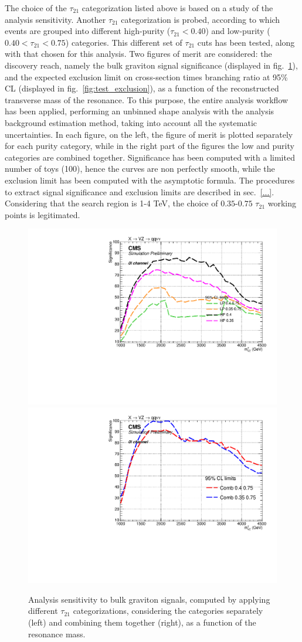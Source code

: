 \noindent The choice of the $\tau_{21}$ categorization listed above is based on a study of the analysis sensitivity. Another $\tau_{21}$ categorization is probed, according to which events are grouped into different high-purity ($\tau_{21} < 0.40$) and low-purity ($0.40 < \tau_{21} < 0.75$) categories. This different set of $\tau_{21}$ cuts has been tested, along with that chosen for this analysis. Two figures of merit are considered: the discovery reach, namely the bulk graviton signal significance (displayed in fig.~\ref{fig:test_significance}), and the expected exclusion limit on cross-section times branching ratio at 95\% CL (displayed in fig.~\ref{fig:test_exclusion}), as a function of the reconstructed transverse mass of the resonance. To this purpose, the entire analysis workflow has been applied, performing an unbinned shape analysis with the analysis background estimation method, taking into account all the systematic uncertainties. In each figure, on the left, the figure of merit is plotted separately for each purity category, while in the right part of the figures the low and purity categories are combined together. Significance has been computed with a limited number of toys (100), hence the curves are non perfectly smooth, while the exclusion limit has been computed with the asymptotic formula. The procedures to extract signal significance and exclusion limits are described in sec.~\ref{...}. Considering that the search region is 1-4 TeV, the choice of $0.35$-$0.75$ $\tau_{21}$ working points is legitimated.

 \begin{figure}[!htb]
   \begin{center}
     \includegraphics[width=.5\textwidth]{TestPurity/Significance_purityTest_LPHP_test.pdf}%
     \includegraphics[width=.5\textwidth]{TestPurity/Significance_purityTest_comb_test.pdf}

   \end{center}
   \caption{Analysis sensitivity to bulk graviton signals, computed by applying different $\tau_{21}$ categorizations, considering the categories separately (left) and combining them together (right), as a function of the resonance mass.}
   \label{fig:test_significance}
 \end{figure}

